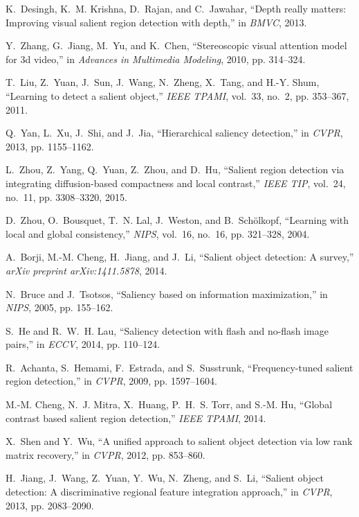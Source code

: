 \documentclass[journal]{IEEEtran}
\begin{document}
\begin{thebibliography}{10}
K.~Desingh, K.~M. Krishna, D.~Rajan, and C.~Jawahar, ``Depth really matters:
  Improving visual salient region detection with depth,'' in \emph{BMVC}, 2013.

Y.~Zhang, G.~Jiang, M.~Yu, and K.~Chen, ``Stereoscopic visual attention model
  for 3d video,'' in \emph{Advances in Multimedia Modeling}, 2010, pp.
  314--324.

T.~Liu, Z.~Yuan, J.~Sun, J.~Wang, N.~Zheng, X.~Tang, and H.-Y. Shum, ``Learning
  to detect a salient object,'' \emph{IEEE TPAMI}, vol.~33, no.~2, pp.
  353--367, 2011.

Q.~Yan, L.~Xu, J.~Shi, and J.~Jia, ``Hierarchical saliency detection,'' in
  \emph{CVPR}, 2013, pp. 1155--1162.

L.~Zhou, Z.~Yang, Q.~Yuan, Z.~Zhou, and D.~Hu, ``Salient region detection via
  integrating diffusion-based compactness and local contrast,'' \emph{IEEE
  TIP}, vol.~24, no.~11, pp. 3308--3320, 2015.

D.~Zhou, O.~Bousquet, T.~N. Lal, J.~Weston, and B.~Sch{\"o}lkopf, ``Learning
  with local and global consistency,'' \emph{NIPS}, vol.~16, no.~16, pp.
  321--328, 2004.

A.~Borji, M.-M. Cheng, H.~Jiang, and J.~Li, ``Salient object detection: A
  survey,'' \emph{arXiv preprint arXiv:1411.5878}, 2014.

N.~Bruce and J.~Tsotsos, ``Saliency based on information maximization,'' in
  \emph{NIPS}, 2005, pp. 155--162.

S.~He and R.~W.~H. Lau, ``Saliency detection with flash and no-flash image
  pairs,'' in \emph{ECCV}, 2014, pp. 110--124.

R.~Achanta, S.~Hemami, F.~Estrada, and S.~Susstrunk, ``Frequency-tuned salient
  region detection,'' in \emph{CVPR}, 2009, pp. 1597--1604.

M.-M. Cheng, N.~J. Mitra, X.~Huang, P.~H.~S. Torr, and S.-M. Hu, ``Global
  contrast based salient region detection,'' \emph{IEEE TPAMI}, 2014.

X.~Shen and Y.~Wu, ``A unified approach to salient object detection via low
  rank matrix recovery,'' in \emph{CVPR}, 2012, pp. 853--860.

H.~Jiang, J.~Wang, Z.~Yuan, Y.~Wu, N.~Zheng, and S.~Li, ``Salient object
  detection: A discriminative regional feature integration approach,'' in
  \emph{CVPR}, 2013, pp. 2083--2090.


\end{thebibliography}
\end{document}
